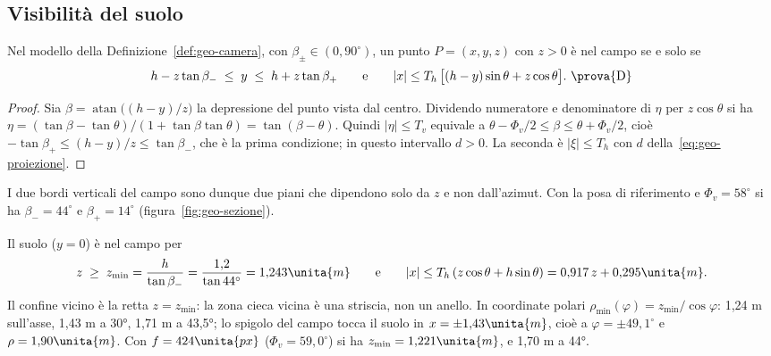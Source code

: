 \subsection{Visibilità del suolo}\label{sec:geo-suolo}

\begin{proposizione}\label{prop:geo-campo}
Nel modello della Definizione~\ref{def:geo-camera}, con $\beta_\pm\in(0,90^\circ)$, un punto $P=(x,y,z)$ con $z>0$ è nel campo se e solo se
\begin{equation}\label{eq:geo-campo}
h-z\tan\beta_-\;\le\;y\;\le\;h+z\tan\beta_+\qquad\text{e}\qquad |x|\le T_h\,\bigl[(h-y)\sin\theta+z\cos\theta\bigr].\ \text{\prova{D}}
\end{equation}
\end{proposizione}
\begin{proof}
Sia $\beta=\operatorname{atan}\bigl((h-y)/z\bigr)$ la depressione del punto vista dal centro. Dividendo numeratore e denominatore di $\eta$ per $z\cos\theta$ si ha $\eta=(\tan\beta-\tan\theta)/(1+\tan\beta\tan\theta)=\tan(\beta-\theta)$. Quindi $|\eta|\le T_v$ equivale a $\theta-\Phi_v/2\le\beta\le\theta+\Phi_v/2$, cioè $-\tan\beta_+\le(h-y)/z\le\tan\beta_-$, che è la prima condizione; in questo intervallo $d>0$. La seconda è $|\xi|\le T_h$ con $d$ della~\eqref{eq:geo-proiezione}.
\end{proof}

I due bordi verticali del campo sono dunque due piani che dipendono solo da $z$ e non dall'azimut. Con la posa di riferimento e $\Phi_v=58^\circ$ si ha $\beta_-=44^\circ$ e $\beta_+=14^\circ$ (figura~\ref{fig:geo-sezione}).

\begin{corollario}[Suolo]\label{cor:geo-suolo}
Il suolo ($y=0$) è nel campo per
\begin{equation}\label{eq:geo-zmin}
z\;\ge\;z_{\min}=\frac{h}{\tan\beta_-}=\frac{1{,}2}{\tan 44^\circ}=1{,}243\unita{m}\qquad\text{e}\qquad |x|\le T_h\,(z\cos\theta+h\sin\theta)=0{,}917\,z+0{,}295\unita{m}.
\end{equation}
Il confine vicino è la retta $z=z_{\min}$: la zona cieca vicina è una striscia, non un anello. In coordinate polari $\rho_{\min}(\varphi)=z_{\min}/\cos\varphi$: 1,24 m sull'asse, 1,43 m a 30°, 1,71 m a 43,5°; lo spigolo del campo tocca il suolo in $x=\pm1{,}43\unita{m}$, cioè a $\varphi=\pm49{,}1^\circ$ e $\rho=1{,}90\unita{m}$. Con $f=424\unita{px}$ ($\Phi_v=59{,}0^\circ$) si ha $z_{\min}=1{,}221\unita{m}$, e 1,70 m a 44°.
\end{corollario}

